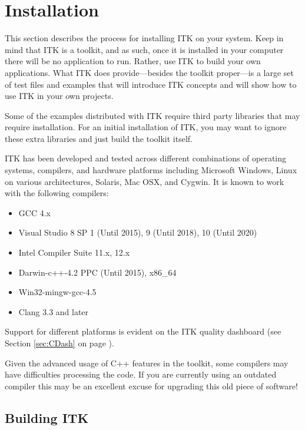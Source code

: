 \chapter{Installation}
\label{chapter:Installation}


This section describes the process for installing ITK on your system. Keep in
mind that ITK is a toolkit, and as such, once it is installed in your computer
there will be no application to run. Rather, use ITK to build your own
applications. What ITK does provide---besides the toolkit proper---is a large
set of test files and examples that will introduce ITK concepts and will show
how to use ITK in your own projects.

Some of the examples distributed with ITK require third party libraries that
may require installation. For an initial installation of ITK, you may want to
ignore these extra libraries and just build the toolkit itself.

ITK has been developed and tested across different combinations of
operating systems, compilers, and hardware platforms including
Microsoft Windows, Linux on various architectures, Solaris, Mac
OSX, and Cygwin.  It is known to work with the following compilers:

\begin{itemize}
\item GCC 4.x
\item Visual Studio 8 SP 1 (Until 2015), 9 (Until 2018), 10 (Until 2020)
\item Intel Compiler Suite 11.x, 12.x
\item Darwin-c++-4.2 PPC (Until 2015), x86\_64
\item Win32-mingw-gcc-4.5
\item Clang 3.3 and later
\end{itemize}

Support for different platforms is evident on the ITK quality dashboard
(see Section \ref{sec:CDash} on page \pageref{sec:CDash}).

Given the advanced usage of C++ features in the toolkit, some
compilers may have difficulties processing the code. If you are
currently using an outdated compiler this may be an excellent excuse
for upgrading this old piece of software!

\section{Building ITK}
\label{sec:Build ITK}

